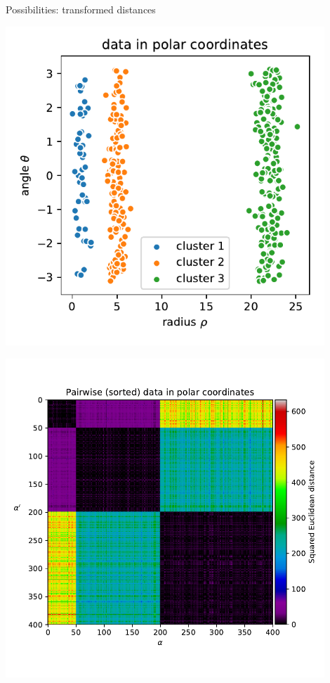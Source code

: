 \begin{frame}{Possibilities: transformed distances}
\begin{center}
\begin{minipage}{0.99\textwidth}
	\begin{center}
	\begin{minipage}{0.35\textwidth}
		\includegraphics[width=0.9\textwidth]{img/m3_circ_data_polar} 
	\end{minipage}
	\begin{minipage}{0.35\textwidth}
		\includegraphics[width=0.9\textwidth]{img/m3_circ_pdist_polar} 
	\end{minipage}
	\end{center}
\end{minipage}
\end{center}

\end{frame}

